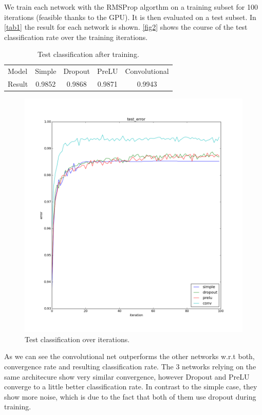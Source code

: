 \documentclass{article}
\begin{document}
We train each network with the RMSProp algorthm on a training subset for 100 iterations 
(feasible thanks to the GPU).
It is then evaluated on a test subset.
In \autoref{tab1} the result for each network is shown.
\autoref{fig2} shows the course of the test classification rate over the training iterations.

\begin{table}[h]
	\centering
	\begin{tabular}{l c c c c}
        Model	&	Simple	& Dropout & PreLU   & Convolutional	\\
        Result	&	0.9852	& 0.9868  & 0.9871  &	0.9943      \\
	\end{tabular}
	\caption{Test classification after training.}
	\label{tab1}
\end{table}

\begin{figure}[h]
	\centering
    \includegraphics[width = .8\textwidth]{graphics/compare_nets.png}
	\caption{Test classification over iterations.}
	\label{fig2}
\end{figure}

As we can see the convolutional net outperforms the other networks w.r.t both, convergence rate and resulting classification rate. 
The 3 networks relying on the same architecure show very similar convergence, however Dropout and PreLU converge to a little better classification rate.
In contrast to the simple case, they show more noise, which is due to the fact that both of them use dropout during training.
\end{document}
